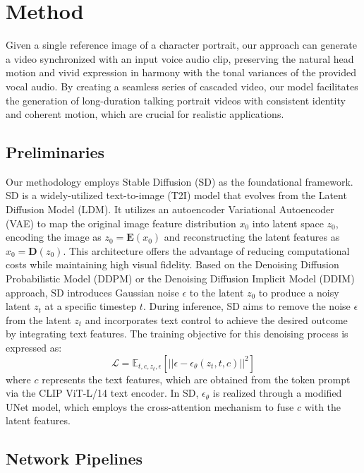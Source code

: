 \section{Method}
\label{sec:method}
Given a single reference image of a character portrait, our approach can generate a video synchronized with an input voice audio clip, preserving the natural head motion and vivid expression in harmony with the tonal variances of the provided vocal audio. By creating a seamless series of cascaded video, our model facilitates the generation of long-duration talking portrait videos with consistent identity and coherent motion, which are crucial for realistic applications.

\subsection{Preliminaries}

Our methodology employs Stable Diffusion (SD) as the foundational framework. SD is a widely-utilized text-to-image (T2I) model that evolves from the Latent Diffusion Model (LDM)\cite{ldm}. It utilizes an autoencoder Variational Autoencoder (VAE)\cite{vae} to map the original image feature distribution $x_0$ into latent space $z_0$, encoding the image as $z_0=\mathbf{E}(x_0)$ and reconstructing the latent features as $x_0=\mathbf{D}(z_0)$. This architecture offers the advantage of reducing computational costs while maintaining high visual fidelity. Based on the Denoising Diffusion Probabilistic Model (DDPM)\cite{ddpm} or the Denoising Diffusion Implicit Model (DDIM)\cite{ddim} approach, SD introduces Gaussian noise $\epsilon$ to the latent $z_0$ to produce a noisy latent $z_t$ at a specific timestep $t$. During inference, SD aims to remove the noise $\epsilon$ from the latent $z_t$ and incorporates text control to achieve the desired outcome by integrating text features. The training objective for this denoising process is expressed as:
\begin{equation}
\mathcal{L}=\mathbb{E}_{t,c, z_t, \epsilon}\left[ ||\epsilon - \epsilon_{\theta}(z_t, t, c)||^2\right]
\end{equation}
where $c$ represents the text features, which are obtained from the token prompt via the CLIP\cite{clip} ViT-L/14 text encoder. In SD, $\epsilon_{\theta}$ is realized through a modified UNet\cite{unet} model, which employs the cross-attention mechanism to fuse $c$ with the latent features.

\subsection{Network Pipelines}

